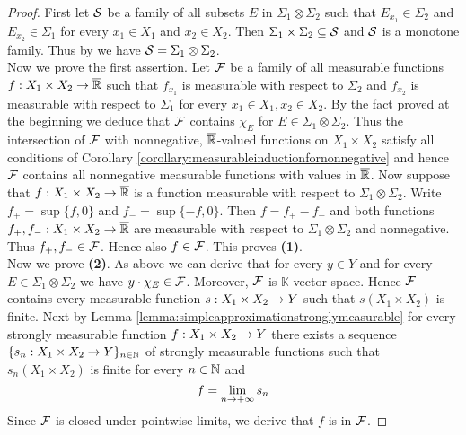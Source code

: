 \begin{proof}
First let ${\mathcal S}$ be a family of all subsets $E$ in $\Sigma_1\otimes \Sigma_2$ such that $E_{x_1}\in \Sigma_2$ and $E_{x_2}\in \Sigma_1$ for every $x_1\in X_1$ and $x_2\in X_2$. Then $\Sigma_1\times \Sigma_2\subseteq {\mathcal S}$ and ${\mathcal S}$ is a monotone family. Thus by {\cite[Theorem 1.5]{Introductiontomeasuretheory}} we have ${\mathcal S} = \Sigma_1\otimes \Sigma_2$.\\
Now we prove the first assertion. Let ${\mathcal F}$ be a family of all measurable functions $f:X_1\times X_2\rightarrow \overline{{\mathbb R}}$ such that $f_{x_1}$ is measurable with respect to $\Sigma_2$ and $f_{x_2}$ is measurable with respect to $\Sigma_1$ for every $x_1\in X_1,x_2\in X_2$. By the fact proved at the beginning we deduce that ${\mathcal F}$ contains $\chi_E$ for $E\in \Sigma_1\otimes \Sigma_2$. Thus the intersection of ${\mathcal F}$ with nonnegative, $\overline{{\mathbb R}}$-valued functions on $X_1\times X_2$ satisfy all conditions of Corollary \ref{corollary:measurableinductionfornonnegative} and hence ${\mathcal F}$ contains all nonnegative measurable functions with values in $\overline{{\mathbb R}}$. Now suppose that $f:X_1\times X_2\rightarrow \overline{{\mathbb R}}$ is a function measurable with respect to $\Sigma_1\otimes \Sigma_2$. Write $f_+ = \sup\{f, 0\}$ and $f_- = \sup\{-f, 0\}$. Then $f = f_+ - f_-$ and both functions $f_+,f_-:X_1\times X_2\rightarrow \overline{{\mathbb R}}$ are measurable with respect to $\Sigma_1\otimes \Sigma_2$ and nonnegative. Thus $f_+,f_-\in {\mathcal F}$. Hence also $f\in {\mathcal F}$. This proves \textbf{(1)}.\\
Now we prove \textbf{(2)}. As above we can derive that for every $y\in Y$ and for every $E\in \Sigma_1\otimes \Sigma_2$ we have $y\cdot \chi_E\in {\mathcal F}$. Moreover, ${\mathcal F}$ is $\mathbb{K}$-vector space. Hence ${\mathcal F}$ contains every measurable function $s:X_1\times X_2\rightarrow Y$ such that $s(X_1\times X_2)$ is finite. Next by Lemma \ref{lemma:simpleapproximationstronglymeasurable} for every strongly measurable function $f:X_1\times X_2\rightarrow Y$ there exists a sequence $\{s_n:X_1\times X_2\rightarrow Y\}_{n\in {\mathbb N}}$ of strongly measurable functions such that $s_n(X_1\times X_2)$ is finite for every $n\in {\mathbb N}$ and
$$f = \lim_{n\rightarrow +\infty}s_n$$
Since ${\mathcal F}$ is closed under pointwise limits, we derive that $f$ is in ${\mathcal F}$.
\end{proof}

